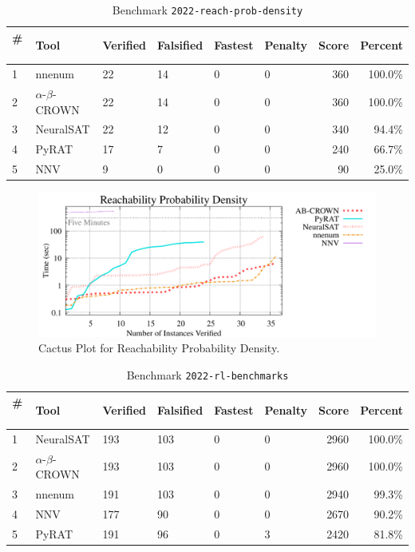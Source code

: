 \begin{table}[h]
\begin{center}
\caption{Benchmark \texttt{2022-reach-prob-density}} \label{tab:cat_{cat}}
{\setlength{\tabcolsep}{2pt}
\begin{tabular}[h]{@{}llllllrr@{}}
\toprule
\textbf{\# ~} & \textbf{Tool} & \textbf{Verified} & \textbf{Falsified} & \textbf{Fastest} & \textbf{Penalty} & \textbf{Score} & \textbf{Percent}\\
\midrule
1 & nnenum & 22 & 14 & 0 & 0 & 360 & 100.0\% \\
2 & $\alpha$-$\beta$-CROWN & 22 & 14 & 0 & 0 & 360 & 100.0\% \\
3 & NeuralSAT & 22 & 12 & 0 & 0 & 340 & 94.4\% \\
4 & PyRAT & 17 & 7 & 0 & 0 & 240 & 66.7\% \\
5 & NNV & 9 & 0 & 0 & 0 & 90 & 25.0\% \\
\bottomrule
\end{tabular}
}
\end{center}
\end{table}



\begin{figure}[h]
\centerline{\includegraphics[width=\textwidth]{cactus/2022_reach_prob_density.pdf}}
\caption{Cactus Plot for Reachability Probability Density.}
\label{fig:quantPic}
\end{figure}



\begin{table}[h]
\begin{center}
\caption{Benchmark \texttt{2022-rl-benchmarks}} \label{tab:cat_{cat}}
{\setlength{\tabcolsep}{2pt}
\begin{tabular}[h]{@{}llllllrr@{}}
\toprule
\textbf{\# ~} & \textbf{Tool} & \textbf{Verified} & \textbf{Falsified} & \textbf{Fastest} & \textbf{Penalty} & \textbf{Score} & \textbf{Percent}\\
\midrule
1 & NeuralSAT & 193 & 103 & 0 & 0 & 2960 & 100.0\% \\
2 & $\alpha$-$\beta$-CROWN & 193 & 103 & 0 & 0 & 2960 & 100.0\% \\
3 & nnenum & 191 & 103 & 0 & 0 & 2940 & 99.3\% \\
4 & NNV & 177 & 90 & 0 & 0 & 2670 & 90.2\% \\
5 & PyRAT & 191 & 96 & 0 & 3 & 2420 & 81.8\% \\
\bottomrule
\end{tabular}
}
\end{center}
\end{table}



